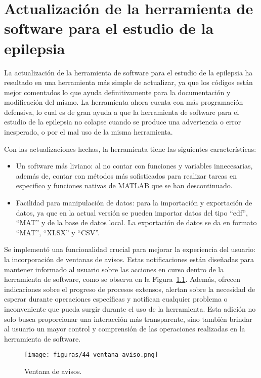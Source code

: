 \chapter{Actualización de la herramienta de software para el estudio de la epilepsia}
La actualización de la herramienta de software para el estudio de la epilepsia ha resultado en una herramienta más simple de actualizar, ya que los códigos están mejor comentados lo que ayuda definitivamente para la documentación y modificación del mismo. La herramienta ahora cuenta con más programación defensiva, lo cual es de gran ayuda a que la herramienta de software para el estudio de la epilepsia no colapse cuando se produce una advertencia o error inesperado, o por el mal uso de la misma herramienta.

Con las actualizaciones hechas, la herramienta tiene las siguientes características:
\begin{itemize}
    \item Un software más liviano: al no contar con funciones y variables innecesarias, además de, contar con métodos más sofisticados para realizar tareas en especifico y funciones nativas de MATLAB que se han descontinuado. 
    \item Facilidad para manipulación de datos: para la importación y exportación de datos, ya que en la actual versión se pueden importar datos del tipo ``edf'', ``MAT'' y de la base de datos local. La exportación de datos se da en formato ``MAT'', ``XLSX'' y ``CSV''.
\end{itemize}

Se implementó una funcionalidad crucial para mejorar la experiencia del usuario: la incorporación de ventanas de avisos. Estas notificaciones están diseñadas para mantener informado al usuario sobre las acciones en curso dentro de la herramienta de software, como se observa en la Figura~\ref{fig: avisos_toolbox}. Además, ofrecen indicaciones sobre el progreso de procesos extensos, alertan sobre la necesidad de esperar durante operaciones específicas y notifican cualquier problema o inconveniente que pueda surgir durante el uso de la herramienta. Esta adición no solo busca proporcionar una interacción más transparente, sino también brindar al usuario un mayor control y comprensión de las operaciones realizadas en la herramienta de software.

\begin{figure}[H]
    \centering
    \texttt{[image: figuras/44\_ventana\_aviso.png]}
    \caption{Ventana de avisos.}
    \label{fig: avisos_toolbox}
\end{figure}

